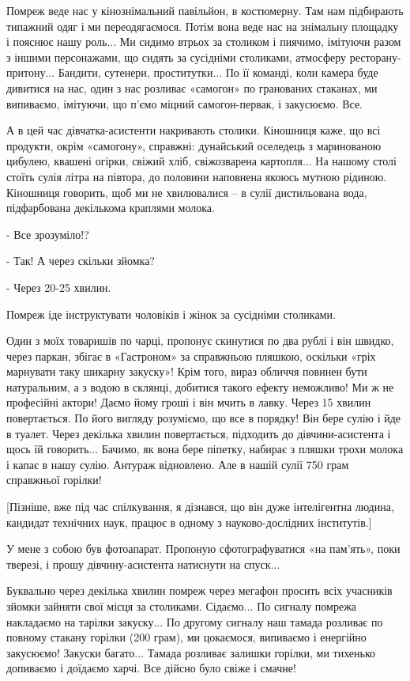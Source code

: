 Помреж веде нас у кінознімальний павільйон, в костюмерну. Там нам підбирають
типажний одяг і ми переодягаємося. Потім вона веде нас на знімальну площадку і
пояснює нашу роль... Ми сидимо втрьох за столиком і пиячимо, імітуючи разом з
іншими персонажами, що сидять за сусідніми столиками, атмосферу
ресторану-притону... Бандити, сутенери, проститутки... По її команді, коли камера
буде дивитися на нас, один з нас розливає «самогон» по гранованих стаканах, ми
випиваємо, імітуючи, що п’ємо міцний самогон-первак, і закусюємо. Все.

А в цей час дівчатка-асистенти накривають столики. Кіношниця каже, що всі
продукти, окрім «самогону», справжні: дунайський оселедець з маринованою
цибулею, квашені огірки, свіжий хліб, свіжозварена картопля... На нашому столі
стоїть сулія літра на півтора, до половини наповнена якоюсь мутною рідиною.
Кіношниця говорить, щоб ми не хвилювалися – в сулії дистильована вода,
підфарбована декількома краплями молока. 

- Все зрозуміло!?

- Так! А через скільки зйомка?

- Через 20-25 хвилин.

Помреж іде інструктувати чоловіків і жінок за сусідніми столиками. 

Один з моїх товаришів по чарці, пропонує скинутися по два рублі і він швидко,
через паркан, збігає в «Гастроном» за справжньою пляшкою, оскільки «гріх
марнувати таку шикарну закуску»! Крім того, вираз обличчя повинен бути
натуральним, а з водою в склянці, добитися такого ефекту неможливо! Ми ж не
професійні актори! Даємо йому гроші і він мчить в лавку. Через 15 хвилин
повертається. По його вигляду розуміємо, що все в порядку! Він бере сулію і йде
в туалет. Через декілька хвилин повертається, підходить до дівчини-асистента і
щось їй говорить... Бачимо, як вона бере піпетку, набирає з пляшки трохи молока і
капає в нашу сулію. Антураж відновлено. Але в нашій сулії 750 грам справжньої
горілки!

[Пізніше, вже під час спілкування, я дізнався, що він дуже інтелігентна людина,
кандидат технічних наук, працює в одному з науково-дослідних інститутів.]

У мене з собою був фотоапарат. Пропоную сфотографуватися «на пам’ять», поки
тверезі, і прошу дівчину-асистента натиснути на спуск...  

Буквально через декілька хвилин помреж через мегафон просить всіх учасників
зйомки зайняти свої місця за столиками. Сідаємо... По сигналу помрежа накладаємо
на тарілки закуску... По другому сигналу наш тамада розливає по повному стакану
горілки (200 грам), ми цокаємося, випиваємо і енергійно закусюємо! Закуски
багато... Тамада розливає залишки горілки, ми тихенько допиваємо і доїдаємо
харчі. Все дійсно було свіже і смачне! 

